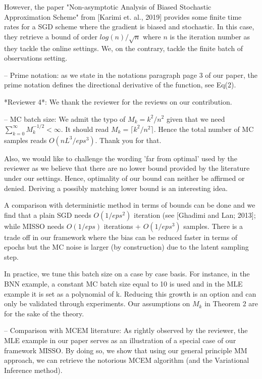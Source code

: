 \documentclass[wcp]{jmlr}
\begin{document}
However, the paper "Non-asymptotic Analysis of Biased Stochastic Approximation Scheme" from [Karimi et. al., 2019] provides some finite time rates for a SGD scheme where the gradient is biased and stochastic. In this case, they retrieve a bound of order $log(n) / \sqrt{n}$ where $n$ is the iteration number as they tackle the online settings.
We, on the contrary, tackle the finite batch of observations setting.

-- Prime notation: as we state in the notations paragraph page 3 of our paper, the prime notation defines the directional derivative of the function, see Eq(2).

*Reviewer 4*: We thank the reviewer for the reviews on our contribution.

-- MC batch size: 
We admit the typo of $M_k = k^2/n^2$ given that we need $\sum_{k=0}^\infty M_k^{-1/2} < \infty$. It should read $M_k =  \lceil k^2/n^2 \rceil$. Hence the total number of MC samples reads $O( n L^3 / eps^3 )$. Thank you for that.

Also, we would like to challenge the wording 'far from optimal' used by the reviewer as we believe that there are no lower bound provided by the literature under our settings. Hence, optimality of our bound can neither be affirmed or denied. Deriving a possibly matching lower bound is an interesting idea.


A comparison with deterministic method in terms of bounds can be done and we find that a plain SGD needs $O(1/eps^2)$ iteration (see [Ghadimi and Lan; 2013]; while MISSO needs $O(1/eps)$ iterations + $O(1/eps^3)$ samples. There is a trade off in our framework where the bias can be reduced faster in terms of epochs but the MC noise is larger (by construction) due to the latent sampling step.

In practice, we tune this batch size on a case by case basis. For instance, in the BNN example, a constant MC batch size equal to 10 is used and in the MLE example it is set as a polynomial of k. Reducing this growth is an option and can only be validated through experiments. Our assumptions on $M_k$ in Theorem 2 are for the sake of the theory.

-- Comparison with MCEM literature: As rightly observed by the reviewer, the MLE example in our paper serves as an illustration of a special case of our framework MISSO.
By doing so, we show that using our general principle MM approach, we can retrieve the notorious MCEM algorithm (and the Variational Inference method).
\end{document}
